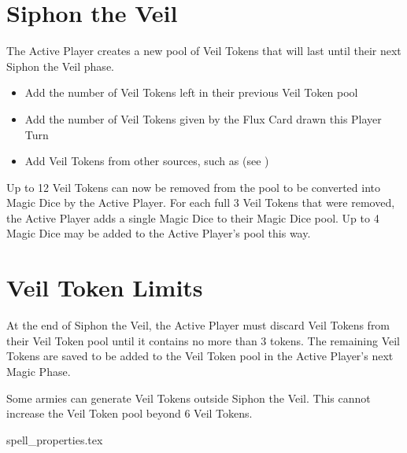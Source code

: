 \section{Siphon the Veil}
\label{siphon_the_veil}

The Active Player creates a new pool of Veil Tokens that will last until their next Siphon the Veil phase.
\begin{itemize}
	\item Add the number of Veil Tokens left in their previous Veil Token pool
	\item Add the number of Veil Tokens given by the Flux Card drawn this Player Turn
	\item Add Veil Tokens from other sources, such as \channel{} (see )
\end{itemize}

 Up to 12 Veil Tokens can now be removed from the pool to be converted into Magic Dice by the Active Player. For each full 3 Veil Tokens that were removed, the Active Player adds a single Magic Dice to their Magic Dice pool. Up to 4 Magic Dice may be added to the Active Player's pool this way.

\section{Veil Token Limits}
\label{veil_token_limits}

At the end of Siphon the Veil, the Active Player must discard Veil Tokens from their Veil Token pool until it contains no more than 3 tokens. The remaining Veil Tokens are saved to be added to the Veil Token pool in the Active Player's next Magic Phase.

Some armies can generate Veil Tokens outside Siphon the Veil. This cannot increase the Veil Token pool beyond 6 Veil Tokens.

\newcommand{\SPPRfigSpellName}{Water Jet}
\newcommand{\SPPRfigSpellEffect}{The target suffers D6 hits with Strength 4, Armour Penetration 0, and \magicalattacks{}.}
\newcommand{\SPPRfigOne}{1 -- Spell Classification}
\newcommand{\SPPRfigTwo}{2 -- Spell Name}
\newcommand{\SPPRfigThree}{3 -- Casting Value}
\newcommand{\SPPRfigFour}{4 -- Type}
\newcommand{\SPPRfigFive}{5 -- Duration}
\newcommand{\SPPRfigSix}{6 -- Effect}

\begin{figure*}[!b]
	{spell_properties.tex}
	\caption{Spell Properties in \nameofthegame{} -- Arcane Compendium.}
	\label{figure/spell_properties}
\end{figure*}

